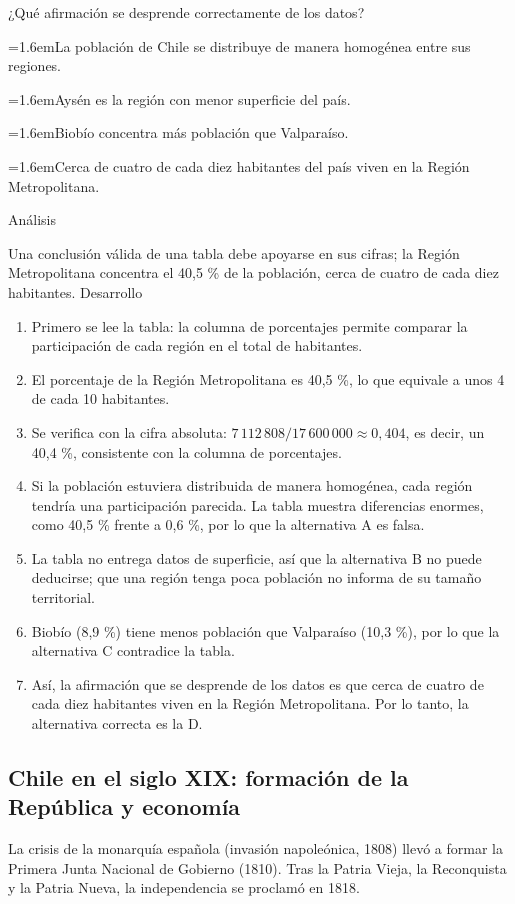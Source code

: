 \documentclass[10pt,a4paper,twocolumn]{article}
\newcommand{\alternativa}[2]{\par\noindent\hangindent=1.6em\hangafter=1\makebox[1.6em][l]{\tecla{#1}}#2\par}
\newcommand{\clave}[1]{\par\smallskip{\sffamily\footnotesize\color{esmeralda} Clave \teclaok{#1}}\par}
\begin{document}
\begin{ejemplo}
¿Qué afirmación se desprende correctamente de los datos?
\alternativa{A}{La población de Chile se distribuye de manera homogénea entre sus regiones.}
\alternativa{B}{Aysén es la región con menor superficie del país.}
\alternativa{C}{Biobío concentra más población que Valparaíso.}
\alternativa{D}{Cerca de cuatro de cada diez habitantes del país viven en la Región Metropolitana.}
\clave{D}
{\sffamily\footnotesize\color{zinc500} Análisis}\par Una conclusión válida de una tabla debe apoyarse en sus cifras; la Región Metropolitana concentra el 40,5 \% de la población, cerca de cuatro de cada diez habitantes.
{\sffamily\footnotesize\color{zinc500} Desarrollo}
\begin{enumerate}
  \item Primero se lee la tabla: la columna de porcentajes permite comparar la participación de cada región en el total de habitantes.
  \item El porcentaje de la Región Metropolitana es 40,5 \%, lo que equivale a unos 4 de cada 10 habitantes.
  \item Se verifica con la cifra absoluta: $7\,112\,808 / 17\,600\,000 \approx 0{,}404$, es decir, un 40,4 \%, consistente con la columna de porcentajes.
  \item Si la población estuviera distribuida de manera homogénea, cada región tendría una participación parecida. La tabla muestra diferencias enormes, como 40,5 \% frente a 0,6 \%, por lo que la alternativa A es falsa.
  \item La tabla no entrega datos de superficie, así que la alternativa B no puede deducirse; que una región tenga poca población no informa de su tamaño territorial.
  \item Biobío (8,9 \%) tiene menos población que Valparaíso (10,3 \%), por lo que la alternativa C contradice la tabla.
  \item Así, la afirmación que se desprende de los datos es que cerca de cuatro de cada diez habitantes viven en la Región Metropolitana. Por lo tanto, la alternativa correcta es la D.
\end{enumerate}
\end{ejemplo}

\subsection{Chile en el siglo XIX: formación de la República y economía}

La crisis de la monarquía española (invasión napoleónica, 1808) llevó a formar la Primera Junta Nacional de Gobierno (1810). Tras la Patria Vieja, la Reconquista y la Patria Nueva, la independencia se proclamó en 1818.
\end{document}
